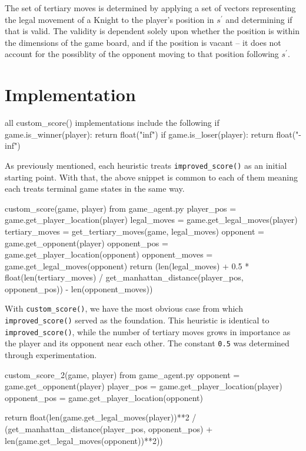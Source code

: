 \documentclass[12pt]{article}
\newcommand{\code}[2][python]{\texttt{#2}}
\begin{document}
The set of tertiary moves is determined by applying a set of vectors 
representing the legal movement of a Knight to the player's position in
$s^\prime$ and determining if that is valid. The validity is dependent solely
upon whether the position is within the dimensions of the game board, and if
the position is vacant -- it does not account for the possiblity of the
opponent moving to that position following $s^\prime$.

\section*{Implementation}

\begin{codeblock}{all custom\_score() implementations include the following}
    if game.is_winner(player):
        return float("inf")
    if game.is_loser(player):
        return float("-inf")
\end{codeblock}

As previously mentioned, each heuristic treats \code{improved_score()} as an
initial starting point. With that, the above snippet is common to each of them
meaning each treats terminal game states in the same way.

\begin{codeblock}{custom\_score(game, player) from game\_agent.py}
    player_pos      =  game.get_player_location(player)
    legal_moves     =  game.get_legal_moves(player)
    tertiary_moves  =  get_tertiary_moves(game, legal_moves)
    opponent        =  game.get_opponent(player)
    opponent_pos    =  game.get_player_location(opponent)
    opponent_moves  =  game.get_legal_moves(opponent)
    return (len(legal_moves)
            + 0.5 * float(len(tertiary_moves)
                  / get_manhattan_distance(player_pos, opponent_pos))
            - len(opponent_moves))
\end{codeblock}

With \code{custom_score()}, we have the most obvious case from which
\code{improved_score()} served as the foundation. This heuristic is identical
to \code{improved_score()}, while the number of tertiary moves grows in
importance as the player and its opponent near each other. The constant
\code{0.5} was determined through experimentation.

\begin{codeblock}{custom\_score\_2(game, player) from game\_agent.py}
    opponent        =  game.get_opponent(player)
    player_pos      =  game.get_player_location(player)
    opponent_pos    =  game.get_player_location(opponent)

    return float(len(game.get_legal_moves(player))**2
                 / (get_manhattan_distance(player_pos, opponent_pos)
                    + len(game.get_legal_moves(opponent))**2))
\end{codeblock}
\end{document}
